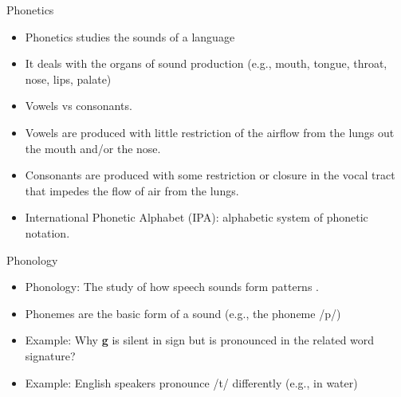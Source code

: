 \documentclass[handout]{beamer}
\begin{document}
\begin{frame}{Phonetics}
\scriptsize{
\begin{itemize}
 \item Phonetics studies the sounds of a language \cite{JohnsonMLSS}
 \item It deals with the organs of sound production (e.g., mouth, tongue, throat, nose, lips, palate)
\item Vowels vs consonants.
\item Vowels are produced with little restriction of the airflow from the lungs out
the mouth and/or the nose. \cite{fromkin2018introduction}
\item Consonants are produced with some restriction or closure in the vocal tract that
impedes the flow of air from the lungs. \cite{fromkin2018introduction}
\item International Phonetic Alphabet (IPA):  alphabetic system of phonetic notation. 
\end{itemize}
}
\end{frame}


\begin{frame}{Phonology}
\scriptsize{
\begin{itemize}
\item Phonology: The study of how speech sounds form patterns \cite{fromkin2018introduction}.
\item Phonemes are  the basic form of a sound (e.g., the phoneme /p/)
\item Example: Why \textbf{g} is silent in sign but is pronounced in the related word signature?
\item Example: English speakers pronounce /t/ differently (e.g., in water)
 
\end{itemize}
}
\end{frame}
\end{document}
